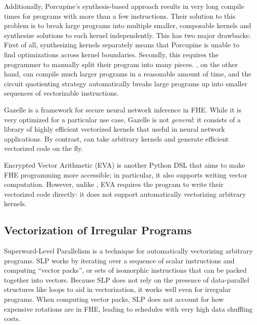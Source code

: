 Additionally, Porcupine's synthesis-based approach results in very long compile times for programs with more than a few instructions.
Their solution to this problem is to break large programs into multiple smaller, composable kernels and synthesize solutions to each kernel independently.
This has two major drawbacks: First of all, synthesizing kernels separately means that Porcupine is unable to find optimizations across kernel boundaries.
Secondly, this requires the programmer to manually split their program into many pieces. 
\system, on the other hand, can compile much larger programs in a reasonable amount of time, and the circuit quotienting strategy automatically breaks large programs up into smaller sequences of vectorizable instructions. 


Gazelle \cite{Gazelle} is a framework for secure neural network inference in FHE.
While it is very optimized for a particular use case, Gazelle is not {\em general}: it consists of a library of highly efficient vectorized kernels that useful in neural network applications.
By contrast, \system can take arbitrary kernels and generate efficient vectorized code on the fly. 

Encrypted Vector Arithmetic (EVA) \cite{EVA} is another Python DSL that aims to make FHE programming more accessible; in particular, it also supports writing vector computation.
However, unlike \system, EVA requires the program to write their vectorized code directly: it does not support automatically vectorizing arbitrary kernels.

\subsection{Vectorization of Irregular Programs}
Superword-Level Parallelism \cite{SLP} is a technique for automatically vectorizing arbitrary programs.
SLP works by iterating over a sequence of scalar instructions and computing ``vector packs'', or sets of isomorphic instructions that can be packed together into vectors.
Because SLP does not rely on the presence of data-parallel structures like loops to aid in vectorization, it works well even for irregular programs.
When computing vector packs, SLP does not account for how expensive rotations are in FHE, leading to schedules with very high data shuffling costs. 

